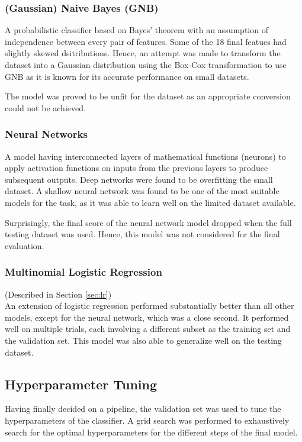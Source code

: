 \documentclass[conference]{IEEEtran}
\begin{document}
    \subsubsection{(Gaussian) Naive Bayes (GNB)}
    \label{sec:gnb}
    A probabilistic classifier based on Bayes' theorem with an assumption of independence between every pair of features.
    Some of the 18 final featues had slightly skewed dsitributions.
    Hence, an attempt was made to transform the dataset into a Gaussian distribution using the Box-Cox transformation
    to use GNB as it is known for its accurate performance on small datasets.

    The model was proved to be unfit for the dataset as an appropriate conversion could not be achieved.

    \subsubsection{Neural Networks}
    \label{sec:nn}
    A model having interconnected layers of mathematical functions (neurons) to apply activation functions on inputs
    from the previous layers to produce subsequent outputs.
    Deep networks were found to be overfitting the small dataset.
    A shallow neural network was found to be one of the most suitable models for the task, as it was able to learn
    well on the limited dataset available.

    Surprisingly, the final score of the neural network model dropped when the full testing dataset was used.
    Hence, this model was not considered for the final evaluation.

    \subsubsection{Multinomial Logistic Regression}
    (Described in Section \ref{sec:lr}) \\
    An extension of logistic regression performed substantially better than all other models, except for the neural network,
    which was a close second.
    It performed well on multiple trials, each involving a different subset as the training set and the validation set.
    This model was also able to generalize well on the testing dataset.

    \subsection{Hyperparameter Tuning}
    \label{sec:hyperparam}
    Having finally decided on a pipeline, the validation set was used to tune the hyperparameters of the classifier.
    A grid search was performed to exhaustively search for the optimal hyperparameters for the different steps of the final model.
\end{document}
